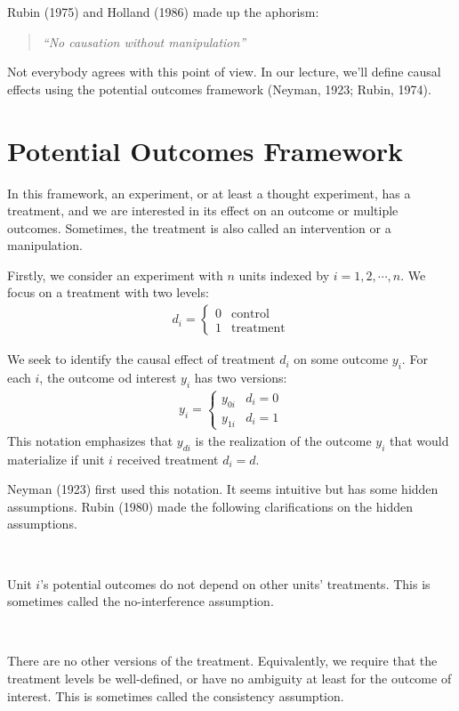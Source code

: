 Rubin (1975\cite{rubin1975bayesian}) and Holland (1986\cite{holland1986statistics}) made up the aphorism\cite{ding2023causalinference}:
\begin{quote}
  \textit{``No causation without manipulation''}
\end{quote}
Not everybody agrees with this point of view. In our lecture, we'll define causal effects using the potential outcomes framework
(Neyman, 1923\cite{neyman1923experiment}; Rubin, 1974\cite{rubin1974estimating}).


\section{Potential Outcomes Framework}

In this framework, an experiment, or at least a thought experiment, 
has a treatment, and we are interested in its effect on an outcome 
or multiple outcomes. Sometimes, the treatment is also called an
intervention or a manipulation.

Firstly, we consider an experiment with $n$ units indexed by $i=1, 2, \cdots, n$.
We focus on a treatment with two levels:
\begin{gather*}
  d_i = \left\{\begin{matrix}
    0 & \text{control}\\
    1 & \text{treatment}
  \end{matrix} \right.
\end{gather*}

We seek to identify the causal effect of treatment $d_i$ on some outcome $y_i$.
For each $i$, the outcome od interest $y_i$ has two versions:
\begin{gather*}
  y_i = \left\{\begin{matrix}
    y_{0i} & d_i=0\\
    y_{1i} & d_i=1
  \end{matrix} \right.
\end{gather*}
This notation emphasizes that $y_{di}$ is the realization of the outcome $y_i$ that would materialize if unit $i$
received treatment $d_i = d$.

Neyman (1923\cite{neyman1923experiment}) first used this notation. It seems intuitive but has some hidden
assumptions. Rubin (1980\cite{rubin1980comment}) made the following clarifications on the hidden assumptions.
\begin{assumption}[No interference]\label{assumption:no_interference}
  \

  Unit $i$'s potential outcomes do not depend on other units' treatments. 
  This is sometimes called the no-interference assumption.
\end{assumption}
\begin{assumption}[Consistency]\label{assumption:consistency}
  \

  There are no other versions of the treatment. 
  Equivalently, we require that the treatment levels be well-defined, 
  or have no ambiguity at least for the outcome of interest. 
  This is sometimes called the consistency assumption.
\end{assumption}

